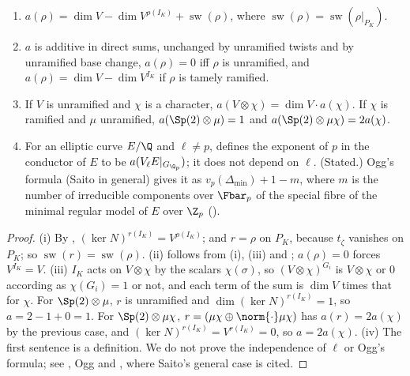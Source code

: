 \begin{proposition}\label{prop:local:conductor}
\begin{enumerate}[label=(\roman*)]
\item $a(\rho)=\dim V-\dim V^{\rho(I_K)}+\operatorname{sw}(\rho)$, where $\operatorname{sw}(\rho)=\operatorname{sw}(\rho|_{P_K})$.
\item $a$ is additive in direct sums, unchanged by unramified twists and by unramified base change, $a(\rho)=0$ iff $\rho$ is unramified, and
$a(\rho)=\dim V-\dim V^{I_K}$ if $\rho$ is tamely ramified.
\item If $V$ is unramified and $\chi$ is a character, $a(V\otimes\chi)=\dim V\cdot a(\chi)$. If $\chi$ is ramified and $\mu$ unramified, $a(\Sp(2)\otimes\mu)=1$ and
$a(\Sp(2)\otimes\mu\chi)=2a(\chi)$.
\item For an elliptic curve $E/\Q$ and $\ell\ne p$,  defines the exponent of $p$ in the conductor of $E$ to be $a(V_\ell E|_{G_{\Q_p}})$;
it does not depend on $\ell$. (Stated.) Ogg's formula (Saito in general) gives it as $v_p(\Delta_{\min})+1-m$, where $m$ is the number of irreducible
components over $\Fbar_p$ of the special fibre of the minimal regular model of $E$ over $\Z_p$ ().
\end{enumerate}
\end{proposition}

\begin{proof}
(i) By , $(\ker N)^{r(I_K)}=V^{\rho(I_K)}$; and $r=\rho$ on $P_K$, because $t_\zeta$ vanishes on $P_K$; so $\operatorname{sw}(r)=\operatorname{sw}(\rho)$.
(ii) follows from (i), (iii) and ; $a(\rho)=0$ forces $V^{I_K}=V$. (iii) $I_K$ acts on $V\otimes\chi$ by the
scalars $\chi(\sigma)$, so $(V\otimes\chi)^{G_i}$ is $V\otimes\chi$ or $0$ according as $\chi(G_i)=1$ or not, and each term of the sum is $\dim V$ times that for $\chi$. For
$\Sp(2)\otimes\mu$, $r$ is unramified and $\dim(\ker N)^{r(I_K)}=1$, so $a=2-1+0=1$. For $\Sp(2)\otimes\mu\chi$, $r=(\mu\chi\oplus\norm{\cdot}\mu\chi)$ has $a(r)=2a(\chi)$
by the previous case, and $(\ker N)^{r(I_K)}=V^{r(I_K)}=0$, so $a=2a(\chi)$. (iv) The first sentence is a definition. We do not prove the independence of $\ell$ or Ogg's formula; see \cite[Section 2]{SerreTate68}, Ogg \cite{Ogg}
and , where Saito's general case is cited.
\end{proof}

